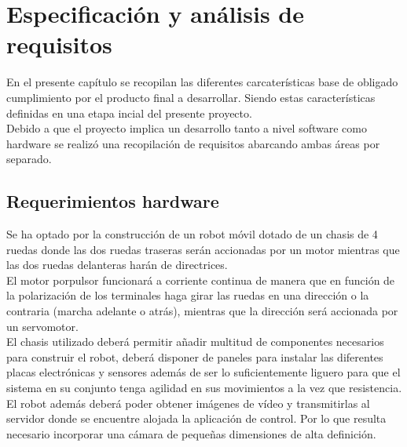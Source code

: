 

\chapter[Requisitos]{Especificación y análisis de requisitos}
\label{chap:requisitos}

En el presente capítulo se recopilan las diferentes carcaterísticas base de obligado cumplimiento por el producto final a desarrollar. Siendo estas características definidas en una
etapa incial del presente proyecto. \\

Debido a que el proyecto implica un desarrollo tanto a nivel software como hardware se realizó una recopilación de requisitos abarcando ambas áreas por separado.\\

\section{Requerimientos hardware}
\label{sec:requerimientos-hardware}

Se ha optado por la construcción de un robot móvil dotado de un chasis de 4 ruedas donde las dos ruedas traseras serán accionadas por un motor mientras que las dos ruedas delanteras
harán de directrices.\\

El motor porpulsor funcionará a corriente continua de manera que en función de la polarización de los terminales haga girar las ruedas en una dirección o la contraria (marcha adelante o atrás), mientras que 
la dirección será accionada por un servomotor.\\

El chasis utilizado deberá permitir añadir multitud de componentes necesarios para construir el robot, deberá disponer de paneles para instalar las diferentes
placas electrónicas y sensores además de ser lo suficientemente liguero para que el sistema en su conjunto tenga agilidad en sus movimientos a la vez que resistencia.\\

El robot además deberá poder obtener imágenes de vídeo y transmitirlas al servidor donde se encuentre alojada la aplicación de control. Por lo que resulta necesario incorporar una cámara de 
pequeñas dimensiones de alta definición.\\

